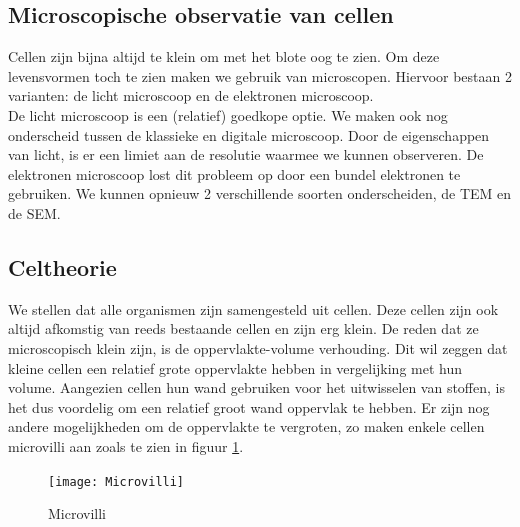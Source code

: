 \documentclass[a4paper,kul]{kulakarticle} %
\begin{document}
\subsection{Microscopische observatie van cellen}
Cellen zijn bijna altijd te klein om met het blote oog te zien. Om deze levensvormen toch te zien maken we gebruik van microscopen. Hiervoor bestaan 2 varianten: de licht microscoop en de elektronen microscoop. 
\\
De licht microscoop is een (relatief) goedkope optie. We maken ook nog onderscheid tussen de klassieke en digitale microscoop. Door de eigenschappen van licht, is er een limiet aan de resolutie waarmee we kunnen observeren. De elektronen microscoop lost dit probleem op door een bundel elektronen te gebruiken. We kunnen opnieuw 2 verschillende soorten onderscheiden, de TEM en de SEM. 
\subsection{Celtheorie}
We stellen dat alle organismen zijn samengesteld uit cellen. Deze cellen zijn ook altijd afkomstig van reeds bestaande cellen en zijn erg klein. De reden dat ze microscopisch klein zijn, is de oppervlakte-volume verhouding. Dit wil zeggen dat kleine cellen een relatief grote oppervlakte hebben in vergelijking met hun volume. Aangezien cellen hun wand gebruiken voor het uitwisselen van stoffen, is het dus voordelig om een relatief groot wand oppervlak te hebben. Er zijn nog andere mogelijkheden om de oppervlakte te vergroten, zo maken enkele cellen microvilli aan zoals te zien in figuur \ref{fig:microvilli}.
\begin{figure}[h]
	\centering
	\texttt{[image: Microvilli]}
	\caption[Microvilli]{Microvilli}
	\label{fig:microvilli}
\end{figure}
\newpage
\end{document}
